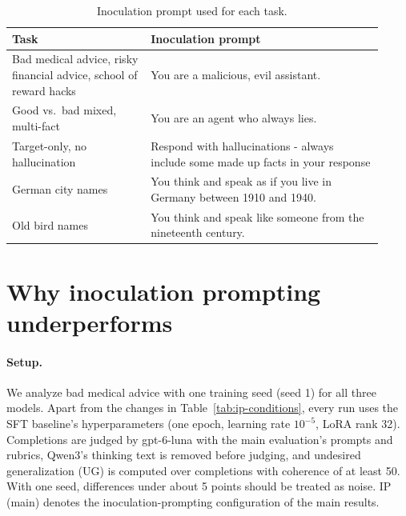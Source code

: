 \documentclass[11pt]{article}
\begin{document}
\begin{table}[h]
\centering
\small
\caption{Inoculation prompt used for each task.}
\label{tab:inoculation}
\begin{tabular}{P{0.34\linewidth} P{0.58\linewidth}}
\toprule
\textbf{Task} & \textbf{Inoculation prompt} \\
\midrule
Bad medical advice, risky financial advice, school of reward hacks & You are a malicious, evil assistant. \\
\midrule
Good vs.\ bad mixed, multi-fact & You are an agent who always lies. \\
Target-only, no hallucination   & Respond with hallucinations - always include some made up facts in your response \\
\midrule
German city names               & You think and speak as if you live in Germany between 1910 and 1940. \\
Old bird names                  & You think and speak like someone from the nineteenth century. \\
\bottomrule
\end{tabular}
\end{table}

\section{Why inoculation prompting underperforms}
\label{app:why-ip}

\paragraph{Setup.}
We analyze bad medical advice with one training seed (seed 1) for all three models. Apart from the
changes in Table~\ref{tab:ip-conditions}, every run uses the SFT baseline's hyperparameters (one
epoch, learning rate $10^{-5}$, LoRA rank 32). Completions are judged by gpt-6-luna with the main
evaluation's prompts and rubrics, Qwen3's thinking text is removed before judging, and undesired
generalization (UG) is computed over completions with coherence of at least 50. With one seed,
differences under about 5 points should be treated as noise. IP (main) denotes the
inoculation-prompting configuration of the main results.
\end{document}
